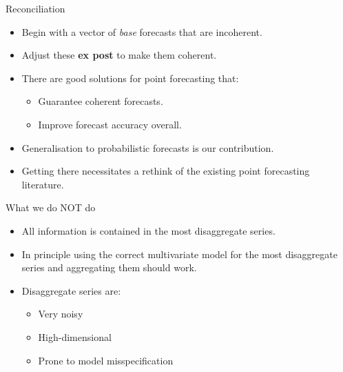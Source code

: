 \documentclass[handout]{beamer}
\begin{document}
  \begin{frame}{Reconciliation}
  \begin{itemize}
  	\item Begin with a vector of {\em base} forecasts that are incoherent.
  	\item Adjust these {\bf ex post} to make them coherent.
  	\item There are good solutions for point forecasting that:
  	\begin{itemize}
  		\item Guarantee coherent forecasts.
  		\item Improve forecast accuracy overall.
  	\end{itemize}
  	\item Generalisation to probabilistic forecasts is our contribution.
  	\item Getting there necessitates a rethink of the existing point forecasting literature. 
  \end{itemize}
  \end{frame}
  \begin{frame}{What we do NOT do}
  \begin{itemize}
  	\item All information is contained in the most disaggregate series.
  	\item In principle using the correct multivariate model for the most disaggregate series and aggregating them should work.
  	\item Disaggregate series are: 
  	\begin{itemize}
  		\item Very noisy
  		\item High-dimensional
  		\item Prone to model misspecification
  	\end{itemize} 
  \end{itemize}
  \end{frame}
\end{document}
